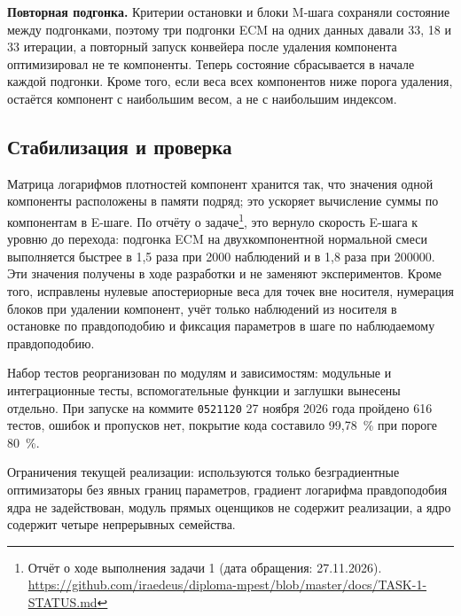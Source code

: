 \textbf{Повторная подгонка.} Критерии остановки и блоки M-шага сохраняли состояние между подгонками, поэтому три подгонки ECM на одних данных давали 33, 18 и 33 итерации, а повторный запуск конвейера после удаления компонента оптимизировал не те компоненты. Теперь состояние сбрасывается в начале каждой подгонки. Кроме того, если веса всех компонентов ниже порога удаления, остаётся компонент с наибольшим весом, а не с наибольшим индексом.

\subsection{Стабилизация и проверка}
\label{sec:migration-check}

Матрица логарифмов плотностей компонент хранится так, что значения одной компоненты расположены в памяти подряд; это ускоряет вычисление суммы по компонентам в E-шаге. По отчёту о задаче\footnote{Отчёт о ходе выполнения задачи 1 (дата обращения: 27.11.2026). \url{https://github.com/iraedeus/diploma-mpest/blob/master/docs/TASK-1-STATUS.md}}, это вернуло скорость E-шага к уровню до перехода: подгонка ECM на двухкомпонентной нормальной смеси выполняется быстрее в 1,5 раза при 2000 наблюдений и в 1,8 раза при 200000. Эти значения получены в ходе разработки и не заменяют экспериментов. Кроме того, исправлены нулевые апостериорные веса для точек вне носителя, нумерация блоков при удалении компонент, учёт только наблюдений из носителя в остановке по правдоподобию и фиксация параметров в шаге по наблюдаемому правдоподобию.

Набор тестов реорганизован по модулям и зависимостям: модульные и интеграционные тесты, вспомогательные функции и заглушки вынесены отдельно. При запуске на коммите \texttt{0521120} 27 ноября 2026 года пройдено 616 тестов, ошибок и пропусков нет, покрытие кода составило 99,78~\% при пороге 80~\%.

Ограничения текущей реализации: используются только безградиентные оптимизаторы без явных границ параметров, градиент логарифма правдоподобия ядра не задействован, модуль прямых оценщиков не содержит реализации, а ядро содержит четыре непрерывных семейства.
